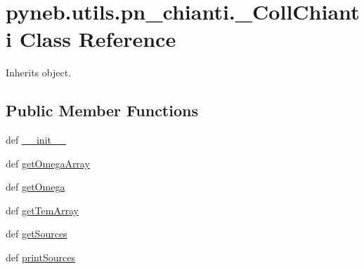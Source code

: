 \hypertarget{classpyneb_1_1utils_1_1pn__chianti_1_1___coll_chianti}{\section{pyneb.\-utils.\-pn\-\_\-chianti.\-\_\-\-Coll\-Chianti Class Reference}
\label{classpyneb_1_1utils_1_1pn__chianti_1_1___coll_chianti}
}


Inherits object.

\subsection*{Public Member Functions}
\begin{DoxyCompactItemize}
\item 
def \hyperlink{classpyneb_1_1utils_1_1pn__chianti_1_1___coll_chianti_ae567e272fc61c51e0ff07ffa6eb3ca2d}{\-\_\-\-\_\-init\-\_\-\-\_\-}
\item 
def \hyperlink{classpyneb_1_1utils_1_1pn__chianti_1_1___coll_chianti_a79ec638d44f16f8df85ed9978896f8a5}{get\-Omega\-Array}
\item 
def \hyperlink{classpyneb_1_1utils_1_1pn__chianti_1_1___coll_chianti_a8dd1bccc8974d0b3a44f03658e993b08}{get\-Omega}
\item 
def \hyperlink{classpyneb_1_1utils_1_1pn__chianti_1_1___coll_chianti_a625343ac2c7b1f7c72f7717f7573d90e}{get\-Tem\-Array}
\item 
def \hyperlink{classpyneb_1_1utils_1_1pn__chianti_1_1___coll_chianti_ad4ee6409d1b66c4f0fde4aa9dbf6cca2}{get\-Sources}
\item 
def \hyperlink{classpyneb_1_1utils_1_1pn__chianti_1_1___coll_chianti_ab6061090f17fd6a1122281157459ec7c}{print\-Sources}
\end{DoxyCompactItemize}
